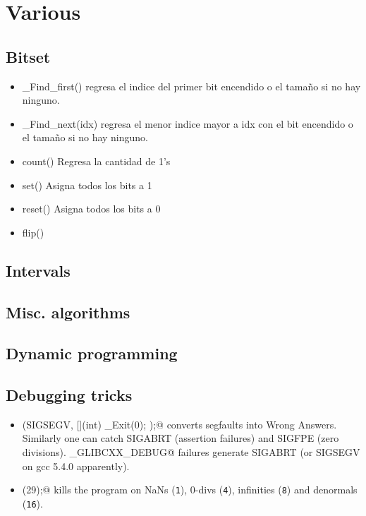 \chapter{Various}

\section{Bitset}

\begin{itemize}
    \item \_Find\_first() regresa el indice del primer bit encendido o el tamaño si no hay ninguno.
    \item \_Find\_next(idx) regresa el menor indice mayor a idx con el bit encendido o el tamaño si no hay ninguno.
    \item count() Regresa la cantidad de 1's
    \item set() Asigna todos los bits a 1
    \item reset() Asigna todos los bits a 0
    \item flip()
\end{itemize}

\section{Intervals}

\section{Misc. algorithms}

\section{Dynamic programming}

\section{Debugging tricks}
	\begin{itemize}
		\item \verb@signal(SIGSEGV, [](int) { _Exit(0); });@ converts segfaults into Wrong Answers.
			Similarly one can catch SIGABRT (assertion failures) and SIGFPE (zero divisions).
			\verb@_GLIBCXX_DEBUG@ failures generate SIGABRT (or SIGSEGV on gcc 5.4.0 apparently).
		\item \verb@feenableexcept(29);@ kills the program on NaNs (\texttt 1), 0-divs (\texttt 4), infinities (\texttt 8) and denormals (\texttt{16}).
	\end{itemize}

